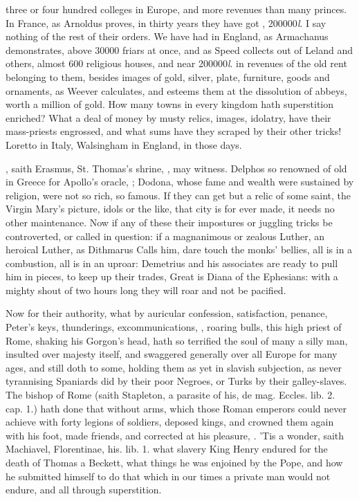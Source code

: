 {three or four hundred colleges in Europe, and more revenues than many
princes. In France, as Arnoldus proves, in thirty years they have got
, 200\thinspace{}000\emph{l}. I say nothing of the rest
of their orders. We have had in England, as Armachanus demonstrates,
above 30\thinspace{}000 friars at once, and as Speed collects out of Leland
and others, almost 600 religious houses, and near 200\thinspace{}000\emph{l}. in
revenues of the old rent belonging to them, besides images of gold,
silver, plate, furniture, goods and ornaments, as Weever
calculates, and esteems them at the dissolution of abbeys, worth a
million of gold. How many towns in every kingdom hath superstition
enriched? What a deal of money by musty relics, images, idolatry, have
their mass-priests engrossed, and what sums have they scraped by their
other tricks! Loretto in Italy, Walsingham in England, in those days.

, saith
Erasmus, St. Thomas's shrine, \etc{}, may witness. Delphos so
renowned of old in Greece for Apollo's oracle, ; Dodona, whose fame
and wealth were sustained by religion, were not so rich, so famous. If
they can get but a relic of some saint, the Virgin Mary's picture,
idols or the like, that city is for ever made, it needs no other
maintenance. Now if any of these their impostures or juggling tricks be
controverted, or called in question: if a magnanimous or zealous
Luther, an heroical Luther, as Dithmarus Calls him, dare touch
the monks' bellies, all is in a combustion, all is in an uproar:
Demetrius and his associates are ready to pull him in pieces, to keep
up their trades,  Great is Diana of the Ephesians: with a mighty
shout of two hours long they will roar and not be pacified.

Now for their authority, what by auricular confession, satisfaction,
penance, Peter's keys, thunderings, excommunications, \etc{}, roaring
bulls, this high priest of Rome, shaking his Gorgon's head, hath so
terrified the soul of many a silly man, insulted over majesty itself,
and swaggered generally over all Europe for many ages, and still doth
to some, holding them as yet in slavish subjection, as never
tyrannising Spaniards did by their poor Negroes, or Turks by their
galley-slaves. The bishop of Rome (saith Stapleton, a parasite of
his, \textlatin{de mag. Eccles. lib. 2. cap. 1.}) hath done that without arms,
which those Roman emperors could never achieve with forty legions of
soldiers, deposed kings, and crowned them again with his foot, made
friends, and corrected at his pleasure, \etc{}.  'Tis a wonder, saith
Machiavel, \textlatin{Florentinae, his. lib. 1.} what slavery King Henry 
endured for the death of Thomas a Beckett, what things he was enjoined
by the Pope, and how he submitted himself to do that which in our times
a private man would not endure, and all through superstition.

}
